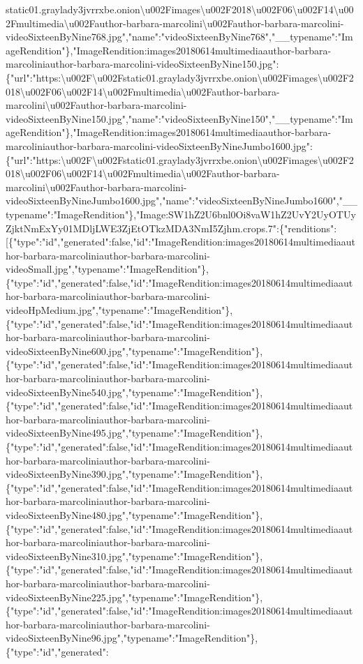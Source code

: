 static01.graylady3jvrrxbe.onion\textbackslash{}u002Fimages\textbackslash{}u002F2018\textbackslash{}u002F06\textbackslash{}u002F14\textbackslash{}u002Fmultimedia\textbackslash{}u002Fauthor-barbara-marcolini\textbackslash{}u002Fauthor-barbara-marcolini-videoSixteenByNine768.jpg","name":"videoSixteenByNine768","\_\_typename":"ImageRendition"\},"ImageRendition:images20180614multimediaauthor-barbara-marcoliniauthor-barbara-marcolini-videoSixteenByNine150.jpg":\{"url":"https:\textbackslash{}u002F\textbackslash{}u002Fstatic01.graylady3jvrrxbe.onion\textbackslash{}u002Fimages\textbackslash{}u002F2018\textbackslash{}u002F06\textbackslash{}u002F14\textbackslash{}u002Fmultimedia\textbackslash{}u002Fauthor-barbara-marcolini\textbackslash{}u002Fauthor-barbara-marcolini-videoSixteenByNine150.jpg","name":"videoSixteenByNine150","\_\_typename":"ImageRendition"\},"ImageRendition:images20180614multimediaauthor-barbara-marcoliniauthor-barbara-marcolini-videoSixteenByNineJumbo1600.jpg":\{"url":"https:\textbackslash{}u002F\textbackslash{}u002Fstatic01.graylady3jvrrxbe.onion\textbackslash{}u002Fimages\textbackslash{}u002F2018\textbackslash{}u002F06\textbackslash{}u002F14\textbackslash{}u002Fmultimedia\textbackslash{}u002Fauthor-barbara-marcolini\textbackslash{}u002Fauthor-barbara-marcolini-videoSixteenByNineJumbo1600.jpg","name":"videoSixteenByNineJumbo1600","\_\_typename":"ImageRendition"\},"Image:SW1hZ2U6bnl0Oi8vaW1hZ2UvY2UyOTUyZjktNmExYy01MDljLWE3ZjEtOTkzMDA3NmI5Zjhm.crops.7":\{"renditions":{[}\{"type":"id","generated":false,"id":"ImageRendition:images20180614multimediaauthor-barbara-marcoliniauthor-barbara-marcolini-videoSmall.jpg","typename":"ImageRendition"\},\{"type":"id","generated":false,"id":"ImageRendition:images20180614multimediaauthor-barbara-marcoliniauthor-barbara-marcolini-videoHpMedium.jpg","typename":"ImageRendition"\},\{"type":"id","generated":false,"id":"ImageRendition:images20180614multimediaauthor-barbara-marcoliniauthor-barbara-marcolini-videoSixteenByNine600.jpg","typename":"ImageRendition"\},\{"type":"id","generated":false,"id":"ImageRendition:images20180614multimediaauthor-barbara-marcoliniauthor-barbara-marcolini-videoSixteenByNine540.jpg","typename":"ImageRendition"\},\{"type":"id","generated":false,"id":"ImageRendition:images20180614multimediaauthor-barbara-marcoliniauthor-barbara-marcolini-videoSixteenByNine495.jpg","typename":"ImageRendition"\},\{"type":"id","generated":false,"id":"ImageRendition:images20180614multimediaauthor-barbara-marcoliniauthor-barbara-marcolini-videoSixteenByNine390.jpg","typename":"ImageRendition"\},\{"type":"id","generated":false,"id":"ImageRendition:images20180614multimediaauthor-barbara-marcoliniauthor-barbara-marcolini-videoSixteenByNine480.jpg","typename":"ImageRendition"\},\{"type":"id","generated":false,"id":"ImageRendition:images20180614multimediaauthor-barbara-marcoliniauthor-barbara-marcolini-videoSixteenByNine310.jpg","typename":"ImageRendition"\},\{"type":"id","generated":false,"id":"ImageRendition:images20180614multimediaauthor-barbara-marcoliniauthor-barbara-marcolini-videoSixteenByNine225.jpg","typename":"ImageRendition"\},\{"type":"id","generated":false,"id":"ImageRendition:images20180614multimediaauthor-barbara-marcoliniauthor-barbara-marcolini-videoSixteenByNine96.jpg","typename":"ImageRendition"\},\{"type":"id","generated":